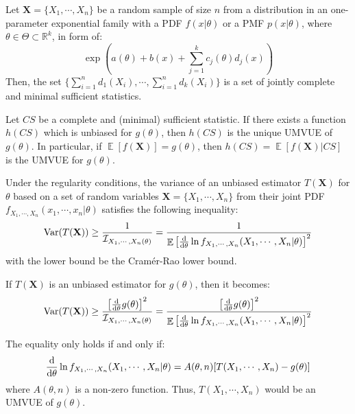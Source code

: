\documentclass{huhtakm-template-book-v2}
\DeclareMathOperator{\E}{\mathbb{E}}
\DeclareMathOperator{\Var}{Var}
\begin{document}
\begin{thm}
	Let $\mathbf{X}=\{X_{1},\cdots,X_{n}\}$ be a random sample of size $n$ from a distribution in an one-parameter exponential family with a PDF $f(x|\theta)$ or a PMF $p(x|\theta)$, where $\theta\in\Theta\subset\mathbb{R}^{k}$, in form of:
	\begin{equation*}
		\exp\left(a(\theta)+b(x)+\sum_{j=1}^{k}c_{j}(\theta)d_{j}(x)\right)
	\end{equation*}
	Then, the set $\{\sum_{i=1}^{n}d_{1}(X_{i}),\cdots,\sum_{i=1}^{n}d_{k}(X_{i})\}$ is a set of jointly complete and minimal sufficient statistics.
\end{thm}
\begin{thm}
	Let $CS$ be a complete and (minimal) sufficient statistic. If there exists a function $h(CS)$ which is unbiased for $g(\theta)$, then $h(CS)$ is the unique UMVUE of $g(\theta)$. In particular, if $\E[f(\mathbf{X})]=g(\theta)$, then $h(CS)=\E[f(\mathbf{X})|CS]$ is the UMVUE for $g(\theta)$.
\end{thm}
\begin{thm}
	Under the regularity conditions, the variance of an unbiased estimator $T(\mathbf{X})$ for $\theta$ based on a set of random variables $\mathbf{X}=\{X_{1},\cdots,X_{n}\}$ from their joint PDF $f_{X_{1},\cdots,X_{n}}(x_{1},\cdots,x_{n}|\theta)$ satisfies the following inequality:
	\begin{equation*}
		\Var(T(\mathbf{X}))\geq\frac{1}{\mathcal{I}_{X_{1},\cdots,X_{n}(\theta)}}=\frac{1}{\E\left[\odv*{\ln{f_{X_{1},\cdots,X_{n}}(X_{1},\cdots,X_{n}|\theta)}}{\theta}\right]^{2}}
	\end{equation*}
	with the lower bound be the Cram\'er-Rao lower bound.
	
	If $T(\mathbf{X})$ is an unbiased estimator for $g(\theta)$, then it becomes:
	\begin{equation*}
		\Var(T(\mathbf{X}))\geq\frac{\left[\odv*{g(\theta)}{\theta}\right]^{2}}{\mathcal{I}_{X_{1},\cdots,X_{n}(\theta)}}=\frac{\left[\odv*{g(\theta)}{\theta}\right]^{2}}{\E\left[\odv*{\ln{f_{X_{1},\cdots,X_{n}}(X_{1},\cdots,X_{n}|\theta)}}{\theta}\right]^{2}}
	\end{equation*}
	
	The equality only holds if and only if:
	\begin{equation*}
		\odv*{\ln{f_{X_{1},\cdots,X_{n}}(X_{1},\cdots,X_{n}|\theta)}}{\theta}=A(\theta,n)[T(X_{1},\cdots,X_{n})-g(\theta)]
	\end{equation*}
	where $A(\theta,n)$ is a non-zero function. Thus, $T(X_{1},\cdots,X_{n})$ would be an UMVUE of $g(\theta)$.
\end{thm}
\end{document}
